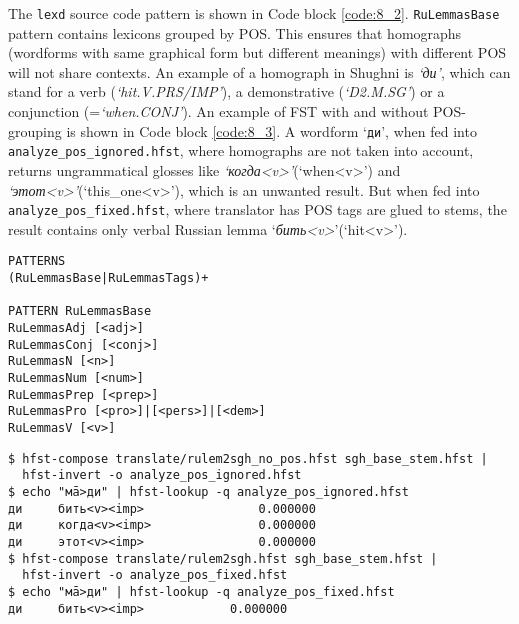 The \texttt{lexd} source code pattern is shown in Code block \ref{code:8_2}. \texttt{RuLemmasBase} pattern contains lexicons grouped by POS. This ensures that homographs (wordforms with same graphical form but different meanings) with different POS will not share contexts. An example of a homograph in Shughni is \textit{`ди'}, which can stand for a verb (\textit{`hit.V.PRS/IMP'}), a demonstrative (\textit{`D2.M.SG'}) or a conjunction (=\textit{`when.CONJ'}). An example of FST with and without POS-grouping is shown in Code block \ref{code:8_3}. A wordform `\texttt{ди}', when fed into \texttt{analyze\_pos\_ignored.hfst}, where homographs are not taken into account, returns ungrammatical glosses like \textit{`когда<v>'}(`when<v>') and \textit{`этот<v>'}(`this\_one<v>'), which is an unwanted result. But when fed into \texttt{analyze\_pos\_fixed.hfst}, where translator has POS tags are glued to stems, the result contains only verbal Russian lemma `\textit{бить<v>}'(`hit<v>').
\begin{code_frame}[float,floatplacement=h]
    \begin{footnotesize}\codespacing
    \begin{verbatim}
PATTERNS
(RuLemmasBase|RuLemmasTags)+

PATTERN RuLemmasBase
RuLemmasAdj [<adj>]
RuLemmasConj [<conj>]
RuLemmasN [<n>]
RuLemmasNum [<num>]
RuLemmasPrep [<prep>]
RuLemmasPro [<pro>]|[<pers>]|[<dem>]
RuLemmasV [<v>]
    \end{verbatim}
    \end{footnotesize}
    \tcblower
    \label{code:8_2}
\end{code_frame}

\begin{code_frame}[float,floatplacement=!htbp]
    \begin{footnotesize}\codespacing
    \begin{verbatim}
$ hfst-compose translate/rulem2sgh_no_pos.hfst sgh_base_stem.hfst | 
  hfst-invert -o analyze_pos_ignored.hfst
$ echo "мā>ди" | hfst-lookup -q analyze_pos_ignored.hfst
ди     бить<v><imp>                0.000000
ди     когда<v><imp>               0.000000
ди     этот<v><imp>                0.000000
$ hfst-compose translate/rulem2sgh.hfst sgh_base_stem.hfst | 
  hfst-invert -o analyze_pos_fixed.hfst
$ echo "мā>ди" | hfst-lookup -q analyze_pos_fixed.hfst
ди     бить<v><imp>            0.000000
    \end{verbatim}
    \end{footnotesize}
    \tcblower
    \label{code:8_3}
\end{code_frame}

